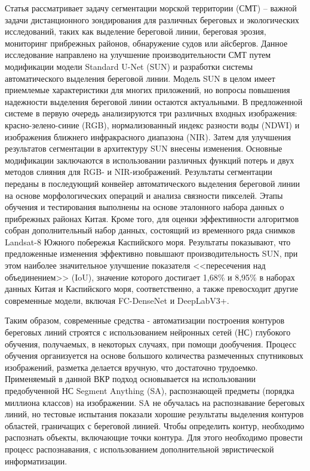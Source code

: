 \documentclass[732,fontsize=14pt,final]{studrep}
\begin{document}
Статья \cite{b3} рассматривает задачу сегментации морской территории (СМТ) -- важной задачи дистанционного зондирования для различных береговых и экологических исследований, таких как выделение береговой линии, береговая эрозия, мониторинг прибрежных районов, обнаружение судов или айсбергов. Данное исследование направлено на улучшение производительности СМТ путем модификации модели Standard U-Net (SUN) и разработки системы автоматического выделения береговой линии. Модель SUN в целом имеет приемлемые характеристики для многих приложений, но вопросы повышения надежности выделения береговой линии остаются актуальными. В предложенной системе в первую очередь анализируются три различных входных изображения: красно-зелено-синие (RGB), нормализованный индекс разности воды (NDWI) и изображения ближнего инфракрасного диапазона (NIR).  Затем для улучшения результатов сегментации в архитектуру SUN внесены изменения. Основные модификации заключаются в использовании различных функций потерь и двух методов слияния для RGB- и NIR-изображений. Результаты сегментации переданы в последующий конвейер автоматического выделения береговой линии на основе морфологических операций и анализа связности пикселей. Этапы обучения и тестирования выполнены на основе эталонного набора данных о прибрежных районах Китая. Кроме того, для оценки эффективности алгоритмов собран дополнительный набор данных, состоящий из временного ряда снимков Landsat-8 Южного побережья Каспийского моря. Результаты показывают, что предложенные изменения эффективно повышают производительность SUN, при этом наиболее значительное улучшение показателя <<пересечения над объединением>> (IoU), значение которого достигает 1,68\% и 8,95\% в наборах данных Китая и Каспийского моря, соответственно, а также превосходит другие современные модели, включая FC-DenseNet и DeepLabV3+.

Таким образом, современные средства \cite{b1}-\cite{b3} автоматизации построения контуров береговых линий строятся с использованием нейронных сетей (НС) глубокого обучения, получаемых, в некоторых случаях, при помощи дообучения. Процесс обучения организуется на основе большого количества размеченных спутниковых изображений, разметка делается вручную, что достаточно трудоемко. Применяемый в данной ВКР подход основывается на использовании предобученной НС Segment Anything (SA), распознающей предметы (порядка миллиона классов) на изображении. SA не обучалась на распознавание береговых линий, но тестовые испытания показали хорошие результаты выделения контуров областей, граничащих с береговой линией. Чтобы определить контур, необходимо распознать объекты, включающие точки контура. Для этого необходимо провести процесс распознавания, с использованием дополнительной эвристической информатизации.
\end{document}

